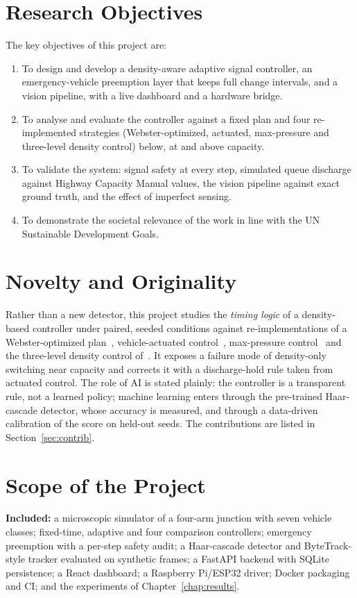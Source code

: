 \section{Research Objectives}
The key objectives of this project are:
\begin{enumerate}
  \item To design and develop a density-aware adaptive signal controller, an emergency-vehicle preemption layer that keeps full change intervals, and a vision pipeline, with a live dashboard and a hardware bridge.
  \item To analyse and evaluate the controller against a fixed plan and four re-implemented strategies (Webster-optimized, actuated, max-pressure and three-level density control) below, at and above capacity.
  \item To validate the system: signal safety at every step, simulated queue discharge against Highway Capacity Manual values, the vision pipeline against exact ground truth, and the effect of imperfect sensing.
  \item To demonstrate the societal relevance of the work in line with the UN Sustainable Development Goals.
\end{enumerate}

\section{Novelty and Originality}
Rather than a new detector, this project studies the \emph{timing logic} of a density-based controller under paired, seeded conditions against re-implementations of a Webster-optimized plan~\cite{ref2}, vehicle-actuated control~\cite{ref23}, max-pressure control~\cite{ref11} and the three-level density control of~\cite{ref1}. It exposes a failure mode of density-only switching near capacity and corrects it with a discharge-hold rule taken from actuated control. The role of AI is stated plainly: the controller is a transparent rule, not a learned policy; machine learning enters through the pre-trained Haar-cascade detector, whose accuracy is measured, and through a data-driven calibration of the score on held-out seeds. The contributions are listed in Section~\ref{sec:contrib}.

\section{Scope of the Project}
\textbf{Included:} a microscopic simulator of a four-arm junction with seven vehicle classes; fixed-time, adaptive and four comparison controllers; emergency preemption with a per-step safety audit; a Haar-cascade detector and ByteTrack-style tracker evaluated on synthetic frames; a FastAPI backend with SQLite persistence; a React dashboard; a Raspberry Pi/ESP32 driver; Docker packaging and CI; and the experiments of Chapter~\ref{chap:results}.

